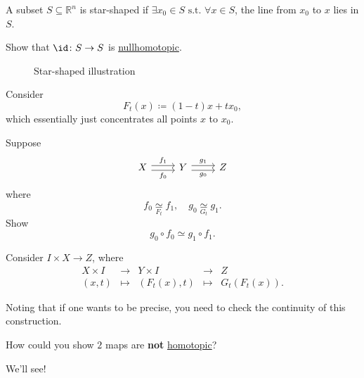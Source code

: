 \begin{exercise}
	A subset \(S\subseteq \mathbb{R} ^n\) is star-shaped if \(\exists x_0\in S \text{ s.t. }\forall x\in S\),
	the line from \(x_0\) to \(x\) lies in \(S\).

	Show that \(\id\colon S\to S\) is \hyperref[def:nullhomotopic]{nullhomotopic}.

	\begin{figure}[H]
		\centering
		\caption{Star-shaped illustration}
		\label{fig:eg:star-shaped}
	\end{figure}
\end{exercise}
\begin{answer}
	Consider
	\[
		F_{t}(x) \coloneqq (1 - t)x+tx_0,
	\]
	which essentially just concentrates all points \(x\) to \(x_0\).
\end{answer}
\begin{exercise}
	Suppose
	\[
		\begin{tikzcd}
			X & Y & Z
			\arrow["{f_0}"', shift right=1, from=1-1, to=1-2]
			\arrow["{g_0}"', shift right=1, from=1-2, to=1-3]
			\arrow["{f_1}", shift left=1, from=1-1, to=1-2]
			\arrow["{g_1}", shift left=1, from=1-2, to=1-3]
		\end{tikzcd}
	\]
	where
	\[
		f_0 \underset{F_{t}}{\simeq} f_1,\quad g_0\underset{G_{t}}{\simeq} g_1.
	\]
	Show
	\[
		g_0\circ f_0\simeq g_{1}\circ f_1.
	\]
\end{exercise}
\begin{answer}
	Consider \(I\times X\to Z\), where
	\[
		\begin{array}{ccccc}
			X \times I & \to     & Y \times I  & \to     & Z                \\
			(x, t)     & \mapsto & (F_t(x), t) & \mapsto & G_{t}(F_{t}(x)).
		\end{array}
	\]
	\begin{remark}
		Noting that if one wants to be precise, you need to check the continuity of this construction.
	\end{remark}
\end{answer}

\begin{exercise}
	How could you show \(2\) maps are \textbf{not} \hyperref[def:homotopic]{homotopic}?
\end{exercise}
\begin{answer}
	We'll see!
\end{answer}